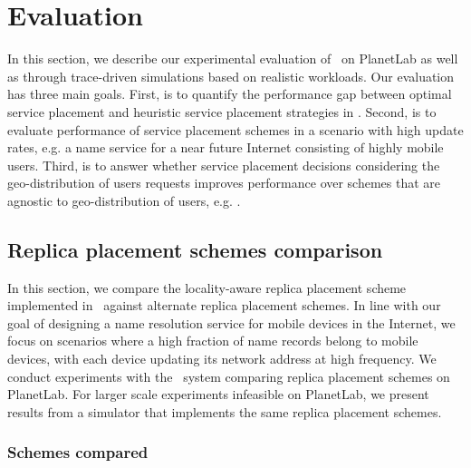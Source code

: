 \section{Evaluation}
\label{sec:eval}



In this section, we describe our experimental evaluation of \auspice\ on PlanetLab as well as through  trace-driven simulations based on realistic workloads. %
Our evaluation has three main goals. 
First, is to quantify the performance gap between optimal service placement and heuristic service placement strategies in \auspice.
Second, is to evaluate performance of service placement  schemes in a scenario with high update rates, e.g. a name service for a near future Internet consisting of highly mobile users. 
Third, is to answer whether service placement decisions considering
the geo-distribution of users requests improves performance over
schemes that are agnostic to geo-distribution of users, e.g. \codons. 



\subsection{Replica placement schemes comparison}

In this section, we compare the locality-aware replica placement scheme implemented in \auspice\ against alternate replica placement schemes. In line with our goal of designing a name resolution service for mobile devices in the Internet, we focus on scenarios where a high fraction of name records belong to mobile devices, with each device updating its network address at high frequency. We conduct experiments with the \auspice\ system comparing replica placement schemes on PlanetLab. For larger scale experiments infeasible on PlanetLab, we present results from a simulator that implements the same replica placement schemes.

\subsubsection{Schemes compared}

